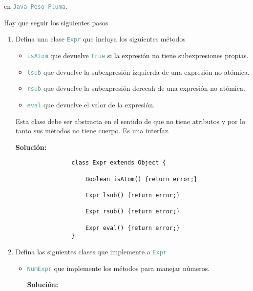 \documentclass{article}
\newcommand{\tx}[1]{\textcolor{CadetBlue} {\texttt{#1}}}
\newcommand{\tb}[1]{\textcolor{RoyalPurple} {\textbf{#1}}}
\begin{document}
\begin{enumerate}
        en \tx{Java Peso Pluma}.

        Hay que seguir los siguientes pasos

        \begin{enumerate}
            \item Defina una clase \tx{Expr} que incluya los siguientes métodos

            \begin{itemize}
                \item \tx{isAtom} que devuelve \tx{true} si la expresión no
                tiene subexpresiones propias.

                \item \tx{lsub} que devuelve la subexpresión izquierda de una
                expresión no atómica.

                \item \tx{rsub} que devuelve la subexpresión derecah de una
                expresión no atómica.

                \item \tx{eval} que devuelve el valor de la expresión.
            \end{itemize}

            Esta clase debe ser abstracta en el sentido de que no tiene 
            atributos y por lo tanto sus métodos no tiene cuerpo. Es una 
            interfaz.

            \tb{Solución:}

            \begin{verbatim}
                class Expr extends Object {

                    Boolean isAtom() {return error;}

                    Expr lsub() {return error;}

                    Expr rsub() {return error;}

                    Expr eval() {return error;}
                }
            \end{verbatim}

            \item Defina las siguientes clases que implemente a \tx{Expr}
            
            \begin{itemize}
                \item \tx{NumExpr} que implemente los métodos para manejar 
                números.

                \tb{Solución:}


\end{itemize}
\end{enumerate}
\end{enumerate}
\end{document}
